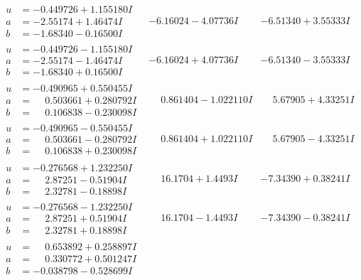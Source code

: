 \documentclass[1p]{elsarticle_modified}
\theoremstyle{definition}
\begin{document}
$$\begin{array}{c|c|c}
\begin{aligned}
u &= -0.449726 + 1.155180 I \\
a &= -2.55174 + 1.46474 I \\
b &= -1.68340 - 0.16500 I\end{aligned}
 & -6.16024 - 4.07736 I & -6.51340 + 3.55333 I \\ \hline\begin{aligned}
u &= -0.449726 - 1.155180 I \\
a &= -2.55174 - 1.46474 I \\
b &= -1.68340 + 0.16500 I\end{aligned}
 & -6.16024 + 4.07736 I & -6.51340 - 3.55333 I \\ \hline\begin{aligned}
u &= -0.490965 + 0.550455 I \\
a &= \phantom{-}0.503661 + 0.280792 I \\
b &= \phantom{-}0.106838 - 0.230098 I\end{aligned}
 & \phantom{-}0.861404 - 1.022110 I & \phantom{-}5.67905 + 4.33251 I \\ \hline\begin{aligned}
u &= -0.490965 - 0.550455 I \\
a &= \phantom{-}0.503661 - 0.280792 I \\
b &= \phantom{-}0.106838 + 0.230098 I\end{aligned}
 & \phantom{-}0.861404 + 1.022110 I & \phantom{-}5.67905 - 4.33251 I \\ \hline\begin{aligned}
u &= -0.276568 + 1.232250 I \\
a &= \phantom{-}2.87251 - 0.51904 I \\
b &= \phantom{-}2.32781 - 0.18898 I\end{aligned}
 & \phantom{-}16.1704 + 1.4493 I & -7.34390 + 0.38241 I \\ \hline\begin{aligned}
u &= -0.276568 - 1.232250 I \\
a &= \phantom{-}2.87251 + 0.51904 I \\
b &= \phantom{-}2.32781 + 0.18898 I\end{aligned}
 & \phantom{-}16.1704 - 1.4493 I & -7.34390 - 0.38241 I \\ \hline\begin{aligned}
u &= \phantom{-}0.653892 + 0.258897 I \\
a &= \phantom{-}0.330772 + 0.501247 I \\
b &= -0.038798 - 0.528699 I\end{aligned}

\end{array}$$
\end{document}
